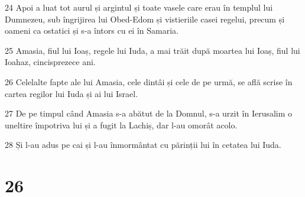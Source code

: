 \par 24 Apoi a luat tot aurul și argintul și toate vasele care erau în templul lui Dumnezeu, sub îngrijirea lui Obed-Edom și vistieriile casei regelui, precum și oameni ca ostatici și s-a întors cu ei în Samaria.
\par 25 Amasia, fiul lui Ioaș, regele lui Iuda, a mai trăit după moartea lui Ioaș, fiul lui Ioahaz, cincisprezece ani.
\par 26 Celelalte fapte ale lui Amasia, cele dintâi și cele de pe urmă, se află scrise în cartea regilor lui Iuda și ai lui Israel.
\par 27 De pe timpul când Amasia s-a abătut de la Domnul, s-a urzit în Ierusalim o uneltire împotriva lui și a fugit la Lachiș, dar l-au omorât acolo.
\par 28 Și l-au adus pe cai și l-au înmormântat cu părinții lui în cetatea lui Iuda.

\chapter{26}

